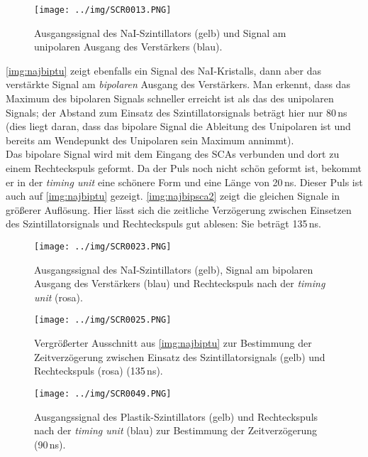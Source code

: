 \begin{figure}[H]
\begin{center}
  \texttt{[image: ../img/SCR0013.PNG]}
  \caption[---]{Ausgangssignal des NaI-Szintillators (gelb) und Signal am unipolaren Ausgang des Verstärkers (blau).}
  \label{img:najunip}
\end{center}
\end{figure}

\autoref{img:najbiptu} zeigt ebenfalls ein Signal des NaI-Kristalls,
dann aber das verstärkte Signal am \emph{bipolaren} Ausgang des Verstärkers.
Man erkennt, dass das Maximum des bipolaren Signals schneller erreicht ist als das des unipolaren Signals;
der Abstand zum Einsatz des Szintillatorsignals beträgt hier nur 80\,ns (dies liegt daran,
dass das bipolare Signal die Ableitung des Unipolaren ist und bereits am Wendepunkt des Unipolaren sein Maximum
annimmt).\\
Das bipolare Signal wird mit dem Eingang des SCAs verbunden und dort zu einem Rechteckspuls geformt.
Da der Puls noch nicht schön geformt ist, bekommt er in der \emph{timing unit} eine schönere Form und eine Länge von
20\,ns. Dieser Puls ist auch auf \autoref{img:najbiptu} gezeigt.
\autoref{img:najbipsca2} zeigt die gleichen Signale in größerer Auflösung.
Hier lässt sich die zeitliche Verzögerung zwischen Einsetzen des Szintillatorsignals und Rechteckspuls
gut ablesen: Sie beträgt 135\,ns.

\begin{figure}[H]
\begin{center}
  \texttt{[image: ../img/SCR0023.PNG]}
  \caption[---]{Ausgangssignal des NaI-Szintillators (gelb),
  Signal am bipolaren Ausgang des Verstärkers (blau)
  und Rechteckspuls nach der \emph{timing unit} (rosa).}
  \label{img:najbiptu}
\end{center}
\end{figure}

\begin{figure}[H]
\begin{center}
  \texttt{[image: ../img/SCR0025.PNG]}
  \caption[---]{Vergrößerter Ausschnitt aus \autoref{img:najbiptu} zur Bestimmung der Zeitverzögerung zwischen
  Einsatz des Szintillatorsignals (gelb) und Rechteckspuls (rosa) (135\,ns).}
  \label{img:najbipsca2}
\end{center}
\end{figure}

\begin{figure}[H]
\begin{center}
  \texttt{[image: ../img/SCR0049.PNG]}
  \caption[---]{Ausgangssignal des Plastik-Szintillators (gelb) und
  Rechteckspuls nach der \emph{timing unit} (blau) zur Bestimmung der Zeitverzögerung (90\,ns).}
  \label{img:plastiktu}
\end{center}
\end{figure}


